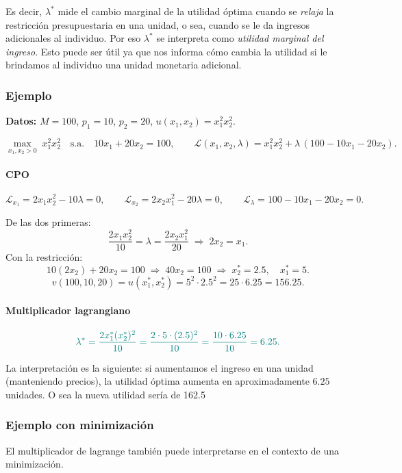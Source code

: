 \documentclass{article}
\begin{document}
Es decir, {\color{teal}\(\lambda^*\) mide el cambio marginal de la utilidad óptima cuando se \emph{relaja} la restricción presupuestaria en una unidad}, o sea, cuando se le da ingresos adicionales al individuo. Por eso \(\lambda^*\) se interpreta como \emph{utilidad marginal del ingreso}. Esto puede ser útil ya que nos informa cómo cambia la utilidad si le brindamos al individuo una unidad monetaria adicional.


\subsubsection*{Ejemplo}



\textbf{Datos:} \(M=100\), \(p_1=10\), \(p_2=20\), \(u(x_1,x_2)=x_1^2 x_2^2\).

\[
\max_{x_1,x_2>0}\; x_1^2 x_2^2 \quad \text{s.a.}\quad 10x_1+20x_2=100,
\qquad
\mathcal L(x_1,x_2,\lambda)=x_1^2 x_2^2+\lambda\,(100-10x_1-20x_2).
\]

\paragraph{CPO}
\[
\mathcal L_{x_1}=2x_1 x_2^2-10\lambda=0,\qquad
\mathcal L_{x_2}=2x_2 x_1^2-20\lambda=0,\qquad
\mathcal L_{\lambda}=100-10x_1-20x_2=0.
\]

De las dos primeras:
\[
\frac{2x_1 x_2^2}{10}=\lambda=\frac{2x_2 x_1^2}{20}
\;\Longrightarrow\;2x_2=x_1.
\]
Con la restricción:
\[
10(2x_2)+20x_2=100\;\Longrightarrow\;40x_2=100\;\Longrightarrow\;x_2^*=2.5,\quad x_1^*=5.
\]
\[
v(100,10,20)=u(x_1^*,x_2^*)=5^2\cdot 2.5^2=25\cdot 6.25=156.25.
\]

\paragraph{Multiplicador lagrangiano}
\[\color{teal}
\lambda^*=\frac{2x_1^*(x_2^*)^2}{10}
=\frac{2\cdot 5\cdot (2.5)^2}{10}
=\frac{10\cdot 6.25}{10}
=6.25.
\]

La interpretación es la siguiente: {\color{teal}si aumentamos el ingreso en una unidad (manteniendo precios), la utilidad óptima aumenta en aproximadamente \(6.25\) unidades. O sea la nueva utilidad sería de 162.5}



\subsubsection*{Ejemplo con minimización}
El multiplicador de lagrange también puede interpretarse en el contexto de una minimización.
\end{document}
